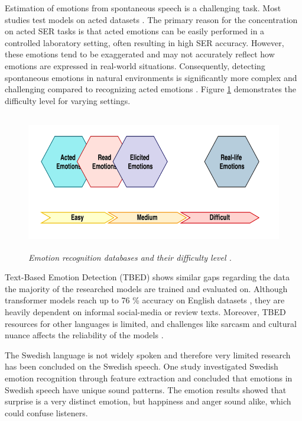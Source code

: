 Estimation of emotions from spontaneous speech is a challenging task. Most studies test models on acted datasets \autocite{Khalil2019, Ahammed2024, Praseetha2022, Alroobaea2024}. The primary reason for the concentration on acted SER tasks is that acted emotions can be easily performed in a controlled laboratory setting, often resulting in high SER accuracy. However, these emotions tend to be exaggerated and may not accurately reflect how emotions are expressed in real-world situations. Consequently, detecting spontaneous emotions in natural environments is significantly more complex and challenging compared to recognizing acted emotions \autocite{Zhang2021}. Figure \ref{fig:databases-diff} demonstrates the difficulty level for varying settings.

\begin{figure}[ht]
    \centering
    \includegraphics[height=6cm]{png/databases difficulty.png}
    \caption{\textit{Emotion recognition databases and their difficulty level \autocite{Khalil2019}.}}
    \label{fig:databases-diff}
\end{figure}

Text-Based Emotion Detection (TBED) shows similar gaps regarding the data the majority of the researched models are trained and evaluated on. Although transformer models reach up to 76 \% accuracy on
English datasets \autocite{Kusal2023}, they are heavily dependent 
on informal social-media or review texts. Moreover, TBED resources for other languages is limited,  
and challenges like sarcasm and cultural nuance affects the reliability of the models \autocite{Maruf2024,Lee2023}.

The Swedish language is not widely spoken and therefore very limited research has been concluded on the Swedish speech. One study \autocite{Ekberg2023} investigated Swedish emotion recognition through feature extraction and concluded that emotions in Swedish speech have unique sound patterns. The emotion results showed that surprise is a very distinct emotion, but happiness and anger sound alike, which could confuse listeners. 

